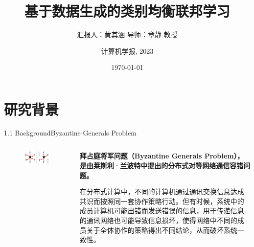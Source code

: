 \documentclass{sintefbeamer}
\title{\huge 基于数据生成的类别均衡联邦学习}
\subtitle{汇报人：黄其涵 \qquad 导师：章静 教授 \qquad }
\author{计算机学报, 2023}
\date{\today}
\theoremstyle{definition}
\begin{document}
\maketitle


\section{研究背景}{}

\begin{frame}{1.1 Background}{Byzantine Generals Problem}
\begin{columns}
\begin{column}{0.35\textwidth}
\begin{figure}[ht]
\centering
\includegraphics[width=1\textwidth]{images/Byzantine_Generals}
\end{figure}
\end{column}
\begin{column}{0.65\textwidth}
\textbf{拜占庭将军问题（Byzantine Generals Problem），是由莱斯利·兰波特中提出的分布式对等网络通信容错问题。}

在分布式计算中，不同的计算机通过通讯交换信息达成共识而按照同一套协作策略行动。但有时候，系统中的成员计算机可能出错而发送错误的信息，用于传递信息的通讯网络也可能导致信息损坏，使得网络中不同的成员关于全体协作的策略得出不同结论，从而破坏系统一致性。

\end{column}
\end{columns}
\end{frame}
\end{document}
